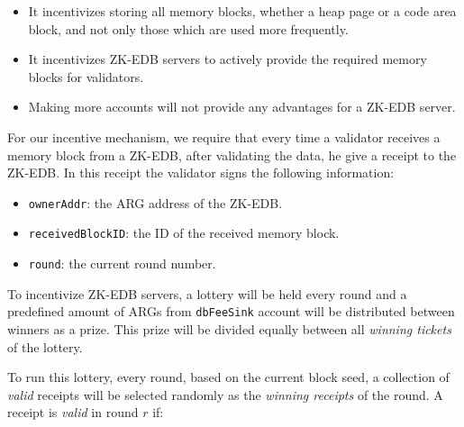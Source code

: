 \begin{itemize}
    \item It incentivizes storing all memory blocks, whether a heap page or a code area block, and not only those
    which are used more frequently.
    \item It incentivizes ZK-EDB servers to actively provide the required memory blocks for validators.
    \item Making more accounts will not provide any advantages for a ZK-EDB server.
\end{itemize}

For our incentive mechanism, we require that every time a validator receives a memory block from a ZK-EDB, after
validating the data, he give a receipt to the ZK-EDB. In this receipt the validator signs the following information:

\begin{itemize}
    \item \texttt{ownerAddr}: the ARG address of the ZK-EDB\@.
    \item \texttt{receivedBlockID}: the ID of the received memory block.
    \item \texttt{round}: the current round number.
\end{itemize}


To incentivize ZK-EDB servers, a lottery will be held every round and a predefined amount of ARGs from
\texttt{dbFeeSink} account will be distributed between winners as a prize. This prize will be divided equally
between all \emph{winning tickets} of the lottery.


To run this lottery, every round, based on the current block seed, a collection of \emph{valid} receipts will be
selected randomly as the \emph{winning receipts} of the round. A receipt is \emph{valid} in round $r$ if:

